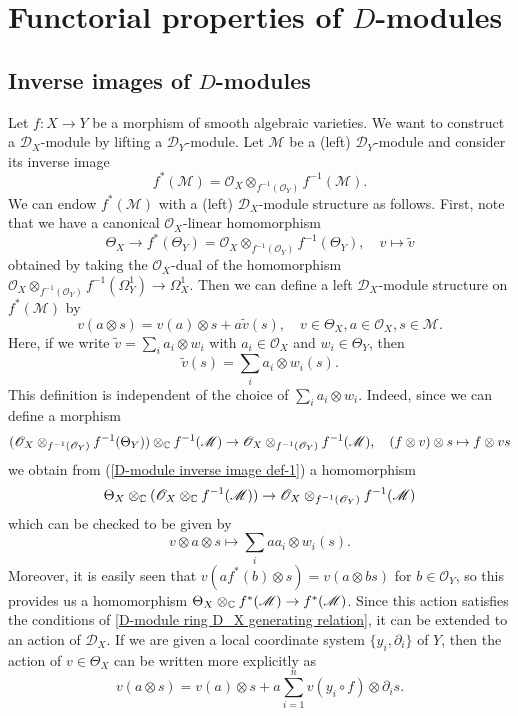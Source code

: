 \section{Functorial properties of \texorpdfstring{$D$}{D}-modules}
\subsection{Inverse images of \texorpdfstring{$D$}{D}-modules}
Let $f:X\to Y$ be a morphism of smooth algebraic varieties. We want to construct a $\mathscr{D}_X$-module by lifting a $\mathscr{D}_Y$-module. Let $\mathscr{M}$ be a (left) $\mathscr{D}_Y$-module and consider its inverse image
\[f^*(\mathscr{M})=\mathscr{O}_X\otimes_{f^{-1}(\mathscr{O}_Y)}f^{-1}(\mathscr{M}).\]
We can endow $f^*(\mathscr{M})$ with a (left) $\mathscr{D}_X$-module structure as follows. First, note that we have a canonical $\mathscr{O}_X$-linear homomorphism
\begin{equation}\label{D-module inverse image def-1}
\Theta_X\to f^*(\Theta_Y)=\mathscr{O}_X\otimes_{f^{-1}(\mathscr{O}_Y)}f^{-1}(\Theta_Y),\quad v\mapsto\tilde{v}
\end{equation}
obtained by taking the $\mathscr{O}_X$-dual of the homomorphism $\mathscr{O}_X\otimes_{f^{-1}(\mathscr{O}_Y)}f^{-1}(\Omega_Y^1)\to\Omega_X^1$. Then we can define a left $\mathscr{D}_X$-module structure on $f^*(\mathscr{M})$ by
\begin{equation}\label{D-module inverse image def-2}
v(a\otimes s)=v(a)\otimes s+a\tilde{v}(s),\quad v\in\Theta_X,a\in\mathscr{O}_X,s\in\mathscr{M}.
\end{equation}
Here, if we write $\tilde{v}=\sum_ia_i\otimes w_i$ with $a_i\in\mathscr{O}_X$ and $w_i\in\Theta_Y$, then
\begin{equation}\label{D-module inverse image def-3}
\tilde{v}(s)=\sum_ia_i\otimes w_i(s).
\end{equation}
This definition is independent of the choice of $\sum_ia_i\otimes w_i$. Indeed, since we can define a morphism
\[(\mathscr{O}_X\otimes_{f^{-1}(\mathscr{O}_Y)}f^{-1}(\Theta_Y))\otimes_{\mathbb{C}}f^{-1}(\mathscr{M})\to \mathscr{O}_X\otimes_{f^{-1}(\mathscr{O}_Y)}f^{-1}(\mathscr{M}),\quad (f\otimes v)\otimes s\mapsto f\otimes vs\]
we obtain from (\ref{D-module inverse image def-1}) a homomorphism
\[\Theta_X\otimes_{\mathbb{C}}(\mathscr{O}_X\otimes_{\mathbb{C}}f^{-1}(\mathscr{M}))\to \mathscr{O}_X\otimes_{f^{-1}(\mathscr{O}_Y)}f^{-1}(\mathscr{M})\]
which can be checked to be given by 
\[v\otimes a\otimes s\mapsto \sum_iaa_i\otimes w_i(s).\]
Moreover, it is easily seen that $v(af^*(b)\otimes s)=v(a\otimes bs)$ for $b\in\mathscr{O}_Y$, so this provides us a homomorphism $\Theta_X\otimes_{\mathbb{C}}f^*(\mathscr{M})\to f^*(\mathscr{M})$. Since this action satisfies the conditions of \cref{D-module ring D_X generating relation}, it can be extended to an action of $\mathscr{D}_X$. If we are given a local coordinate system $\{y_i,\partial_i\}$ of $Y$, then the action of $v\in\Theta_X$ can be written more explicitly as
\begin{equation}\label{D-module inverse image def-4}
v(a\otimes s)=v(a)\otimes s+a\sum_{i=1}^{n}v(y_i\circ f)\otimes\partial_is.
\end{equation}

